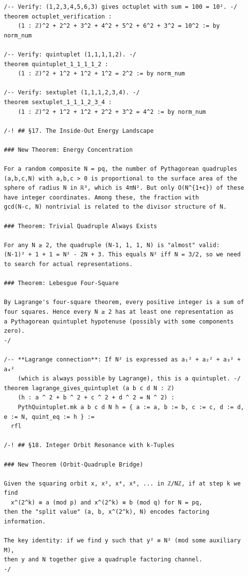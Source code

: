 \documentclass[11pt,openany]{book}
\theoremstyle{definition}
\theoremstyle{plain}
\theoremstyle{remark}
\begin{document}
\begin{lstlisting}[style=lean]
/-- Verify: (1,2,3,4,5,6,3) gives octuplet with sum = 100 = 10². -/
theorem octuplet_verification :
    (1 : ℤ)^2 + 2^2 + 3^2 + 4^2 + 5^2 + 6^2 + 3^2 = 10^2 := by norm_num

/-- Verify: quintuplet (1,1,1,1,2). -/
theorem quintuplet_1_1_1_1_2 :
    (1 : ℤ)^2 + 1^2 + 1^2 + 1^2 = 2^2 := by norm_num

/-- Verify: sextuplet (1,1,1,2,3,4). -/
theorem sextuplet_1_1_1_2_3_4 :
    (1 : ℤ)^2 + 1^2 + 1^2 + 2^2 + 3^2 = 4^2 := by norm_num

/-! ## §17. The Inside-Out Energy Landscape

### New Theorem: Energy Concentration

For a random composite N = pq, the number of Pythagorean quadruples
(a,b,c,N) with a,b,c > 0 is proportional to the surface area of the
sphere of radius N in ℝ³, which is 4πN². But only O(N^{1+ε}) of these
have integer coordinates. Among these, the fraction with
gcd(N-c, N) nontrivial is related to the divisor structure of N.

### Theorem: Trivial Quadruple Always Exists

For any N ≥ 2, the quadruple (N-1, 1, 1, N) is "almost" valid:
(N-1)² + 1 + 1 = N² - 2N + 3. This equals N² iff N = 3/2, so we need
to search for actual representations.

### Theorem: Lebesgue Four-Square

By Lagrange's four-square theorem, every positive integer is a sum of
four squares. Hence every N ≥ 2 has at least one representation as
a Pythagorean quintuplet hypotenuse (possibly with some components zero).
-/

/-- **Lagrange connection**: If N² is expressed as a₁² + a₂² + a₃² + a₄²
    (which is always possible by Lagrange), this is a quintuplet. -/
theorem lagrange_gives_quintuplet (a b c d N : ℤ)
    (h : a ^ 2 + b ^ 2 + c ^ 2 + d ^ 2 = N ^ 2) :
    PythQuintuplet.mk a b c d N h = { a := a, b := b, c := c, d := d, e := N, quint_eq := h } :=
  rfl

/-! ## §18. Integer Orbit Resonance with k-Tuples

### New Theorem (Orbit-Quadruple Bridge)

Given the squaring orbit x, x², x⁴, x⁸, ... in ℤ/Nℤ, if at step k we find
  x^(2^k) ≡ a (mod p) and x^(2^k) ≡ b (mod q) for N = pq,
then the "split value" (a, b, x^(2^k), N) encodes factoring information.

The key identity: if we find y such that y² ≡ N² (mod some auxiliary M),
then y and N together give a quadruple factoring channel.
-/


\end{lstlisting}
\end{document}
